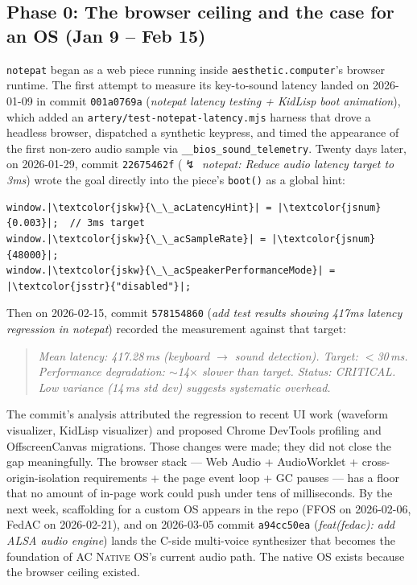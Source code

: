 \documentclass[10pt,letterpaper,twocolumn]{article}
\newcommand{\acos}{\textsc{AC Native OS}}
\begin{document}
\subsection{Phase 0: The browser ceiling and the case for an OS (Jan 9 -- Feb 15)}

\texttt{notepat} began as a web piece running inside \texttt{aesthetic.computer}'s browser runtime. The first attempt to measure its key-to-sound latency landed on 2026-01-09 in commit \texttt{001a0769a} (\emph{notepat latency testing + KidLisp boot animation}), which added an \texttt{artery/test-notepat-latency.mjs} harness that drove a headless browser, dispatched a synthetic keypress, and timed the appearance of the first non-zero audio sample via \texttt{\_\_bios\_sound\_telemetry}. Twenty days later, on 2026-01-29, commit \texttt{22675462f} (\emph{$\boldsymbol\lightning$ notepat: Reduce audio latency target to 3ms}) wrote the goal directly into the piece's \texttt{boot()} as a global hint:

\begin{lstlisting}[style=accstyle,basicstyle=\ttfamily\footnotesize]
window.|\textcolor{jskw}{\_\_acLatencyHint}| = |\textcolor{jsnum}{0.003}|;  // 3ms target
window.|\textcolor{jskw}{\_\_acSampleRate}| = |\textcolor{jsnum}{48000}|;
window.|\textcolor{jskw}{\_\_acSpeakerPerformanceMode}| = |\textcolor{jsstr}{"disabled"}|;
\end{lstlisting}

Then on 2026-02-15, commit \texttt{578154860} (\emph{add test results showing 417ms latency regression in notepat}) recorded the measurement against that target:

\begin{quote}\small\itshape
Mean latency: 417.28\,ms (keyboard $\rightarrow$ sound detection). Target: $<$30\,ms. Performance degradation: $\sim$14$\times$ slower than target. Status: CRITICAL. Low variance (14\,ms std dev) suggests systematic overhead.
\end{quote}

The commit's analysis attributed the regression to recent UI work (waveform visualizer, KidLisp visualizer) and proposed Chrome DevTools profiling and OffscreenCanvas migrations. Those changes were made; they did not close the gap meaningfully. The browser stack --- Web Audio + AudioWorklet + cross-origin-isolation requirements + the page event loop + GC pauses --- has a floor that no amount of in-page work could push under tens of milliseconds. By the next week, scaffolding for a custom OS appears in the repo (FFOS on 2026-02-06, FedAC on 2026-02-21), and on 2026-03-05 commit \texttt{a94cc50ea} (\emph{feat(fedac): add ALSA audio engine}) lands the C-side multi-voice synthesizer that becomes the foundation of \acos{}'s current audio path. The native OS exists because the browser ceiling existed.
\end{document}
